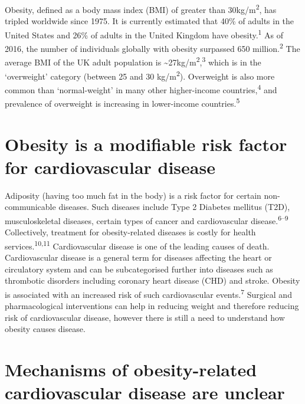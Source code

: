 \documentclass[11pt,twoside]{bristolthesis}
\begin{document}
Obesity, defined as a body mass index (BMI) of greater than 30kg/m\textsuperscript{2}, has tripled worldwide since 1975. It is currently estimated that 40\% of adults in the United States and 26\% of adults in the United Kingdom have obesity.\textsuperscript{1} As of 2016, the number of individuals globally with obesity surpassed 650 million.\textsuperscript{2} The average BMI of the UK adult population is \textasciitilde27kg/m\textsuperscript{2},\textsuperscript{3} which is in the `overweight' category (between 25 and 30 kg/m\textsuperscript{2}). Overweight is also more common than `normal-weight' in many other higher-income countries,\textsuperscript{4} and prevalence of overweight is increasing in lower-income countries.\textsuperscript{5}

\hypertarget{obesity-is-a-modifiable-risk-factor-for-cardiovascular-disease}{%
\section{Obesity is a modifiable risk factor for cardiovascular disease}\label{obesity-is-a-modifiable-risk-factor-for-cardiovascular-disease}}

Adiposity (having too much fat in the body) is a risk factor for certain non-communicable diseases. Such diseases include Type 2 Diabetes mellitus (T2D), musculoskeletal diseases, certain types of cancer and cardiovascular disease.\textsuperscript{6--9} Collectively, treatment for obesity-related diseases is costly for health services.\textsuperscript{10,11} Cardiovascular disease is one of the leading causes of death. Cardiovascular disease is a general term for diseases affecting the heart or circulatory system and can be subcategorised further into diseases such as thrombotic disorders including coronary heart disease (CHD) and stroke. Obesity is associated with an increased risk of such cardiovascular events.\textsuperscript{7} Surgical and pharmacological interventions can help in reducing weight and therefore reducing risk of cardiovascular disease, however there is still a need to understand how obesity causes disease.

\hypertarget{mechanisms-of-obesity-related-cardiovascular-disease-are-unclear}{%
\section{Mechanisms of obesity-related cardiovascular disease are unclear}\label{mechanisms-of-obesity-related-cardiovascular-disease-are-unclear}}
\end{document}
